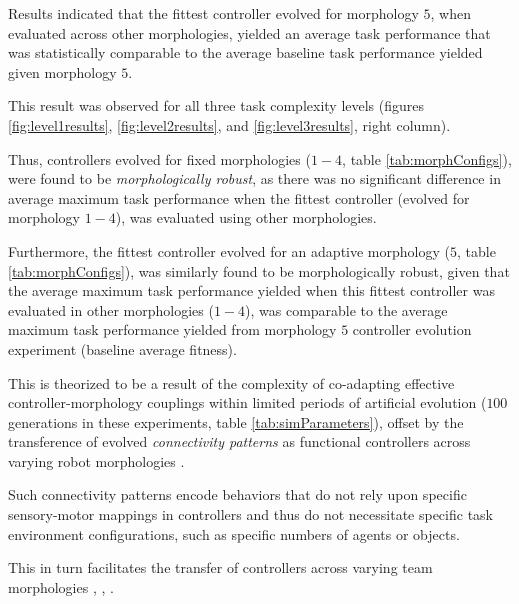 Results indicated that the fittest controller evolved for morphology $5$, when evaluated across
other morphologies, yielded an average task performance that was statistically comparable to
the average baseline task performance yielded given morphology $5$.

This result was observed for all three task complexity levels
(figures \ref{fig:level1results}, \ref{fig:level2results}, and \ref{fig:level3results}, right column).

Thus, controllers evolved for fixed morphologies ($1-4$, table \ref{tab:morphConfigs}), were
found to be \textit{morphologically robust}, as there was no significant difference in average maximum
task performance when the fittest controller (evolved for morphology $1-4$), was evaluated using other
morphologies.

Furthermore, the fittest controller evolved for an adaptive morphology ($5$, table \ref{tab:morphConfigs}),
was similarly found to be morphologically robust, given that the average maximum task performance
yielded when this fittest controller was evaluated in other morphologies ($1-4$), was comparable to
the average maximum task performance yielded from morphology $5$ controller evolution experiment (baseline average fitness).

This is theorized to be a result of the complexity of co-adapting effective controller-morphology
couplings \cite{PfeiferBongard2006} within limited periods of artificial evolution ($100$ generations in these experiments,
table \ref{tab:simParameters}), offset by the transference of evolved
\textit{connectivity patterns} \cite{GauciStanley2010} as functional controllers across varying
robot morphologies  \cite{RisiStanley2013}.

Such connectivity patterns encode behaviors that do not rely upon specific sensory-motor mappings in
controllers and thus do not necessitate specific task environment configurations,
such as specific numbers of agents or objects.

This in turn facilitates the transfer of controllers across varying team morphologies
\cite{verbancsics_evolving_2010}, \cite{DidiNitschke2016SSCI}, \cite{DidiNitschke2016}.

